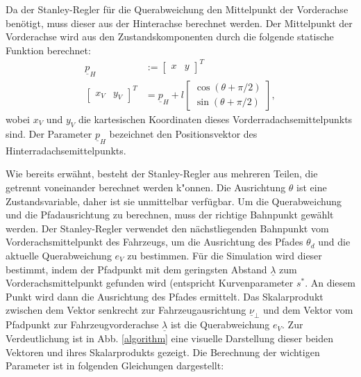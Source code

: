 \documentclass[arbeit=studie,oneside,BCOR=12mm]{ArbeitRST}
\begin{document}
Da der Stanley-Regler für die Querabweichung den Mittelpunkt der Vorderachse
benötigt, muss dieser aus der Hinterachse berechnet werden. Der Mittelpunkt der
Vorderachse wird aus den Zustandskomponenten durch die folgende statische
Funktion \cite{car-model} berechnet: 
\begin{subequations}
\begin{align}
    \underline{p}_H &:= 
  \begin{bmatrix}
    x & y
  \end{bmatrix}^T \\
  \begin{bmatrix}
    x_V & y_V
  \end{bmatrix}^T
    &= \underline{p}_H + l 
  \begin{bmatrix}
    \cos(\theta + \pi/2) \\ 
    \sin(\theta + \pi/2)
  \end{bmatrix},
  \label{eq:Transformation from Rear Axle to Front Axle}
\end{align}
\end{subequations}
wobei $x_V$ und $y_V$ die kartesischen Koordinaten dieses Vorderradachsemittelpunkts sind.
Der Parameter $\underline{p}_H$ bezeichnet den Positionsvektor des Hinterradachsemittelpunkts.

Wie bereits erwähnt, besteht der Stanley-Regler aus mehreren Teilen, die
getrennt voneinander berechnet werden k"onnen. Die Ausrichtung $\theta$ ist eine
Zustandsvariable, daher ist sie unmittelbar verfügbar. Um die Querabweichung und die
Pfadausrichtung zu berechnen, muss der richtige Bahnpunkt gewählt werden. Der
Stanley-Regler verwendet den nächstliegenden Bahnpunkt vom
Vorderachsmittelpunkt des Fahrzeugs, um die Ausrichtung des Pfades $\theta_d$
und die aktuelle Querabweichung $e_{V}$ zu bestimmen. Für die Simulation wird
dieser bestimmt, indem der Pfadpunkt mit dem geringsten Abstand $\underline{\lambda}$ zum
Vorderachsmittelpunkt gefunden wird (entspricht Kurvenparameter $s^*$. An diesem Punkt wird
dann die Ausrichtung des Pfades ermittelt. Das Skalarprodukt zwischen dem
Vektor senkrecht zur Fahrzeugausrichtung $\underline{\nu}_{\perp}$ und dem Vektor
vom Pfadpunkt zur Fahrzeugvorderachse $\underline{\lambda}$ ist die
Querabweichung $e_{V}$. Zur Verdeutlichung ist in Abb. \ref{algorithm} eine visuelle
Darstellung dieser beiden Vektoren und ihres Skalarprodukts gezeigt. Die Berechnung
der wichtigen Parameter ist in folgenden Gleichungen dargestellt: \\
\end{document}
